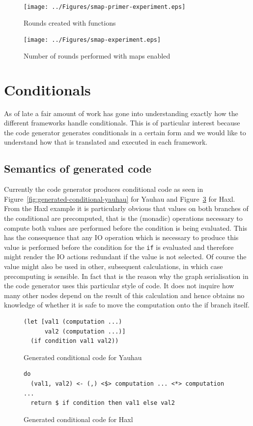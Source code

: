 \begin{figure}
    \texttt{[image: ../Figures/smap-primer-experiment.eps]}
    \caption{Rounds created with functions}
    \label{fig:smap-experiment-primer}
\end{figure}

\begin{figure}
    \texttt{[image: ../Figures/smap-experiment.eps]}
    \caption{Number of rounds performed with maps enabled}
    \label{fig:smap-experiment}
\end{figure}

\section{Conditionals}

As of late a fair amount of work has gone into understanding exactly how the different frameworks handle conditionals.
This is of particular interest because the code generator generates conditionals in a certain form and we would like to understand how that is translated and executed in each framework.

\subsection{Semantics of generated code}

Currently the code generator produces conditional code as seen in Figure~\ref{fig:generated-conditional-yauhau} for Yauhau and Figure~\ref{fig:generated-conditional-haxl} for Haxl.
From the Haxl example it is particularly obvious that values on both branches of the conditional are precomputed, that is the (monadic) operations necessary to compute both values are performed before the condition is being evaluated.
This has the consequence that any IO operation which is necessary to produce this value is performed before the condition for the \texttt{if} is evaluated and therefore might render the IO actions redundant if the value is not selected.
Of course the value might also be used in other, subsequent calculations, in which case precomputing is sensible.
In fact that is the reason why the graph serialisation in the code generator uses this particular style of code.
It does not inquire how many other nodes depend on the result of this calculation and hence obtains no knowledge of whether it is safe to move the computation onto the if branch itself.

\begin{figure}
\begin{verbatim}
(let [val1 (computation ...)
      val2 (computation ...)]
  (if condition val1 val2))
\end{verbatim}
\caption{Generated conditional code for Yauhau}
\label{fig:generated-conditional-yauhau}
\begin{verbatim}
do
  (val1, val2) <- (,) <$> computation ... <*> computation ...
  return $ if condition then val1 else val2
\end{verbatim}
\caption{Generated conditional code for Haxl}
\label{fig:generated-conditional-haxl}
\end{figure}

